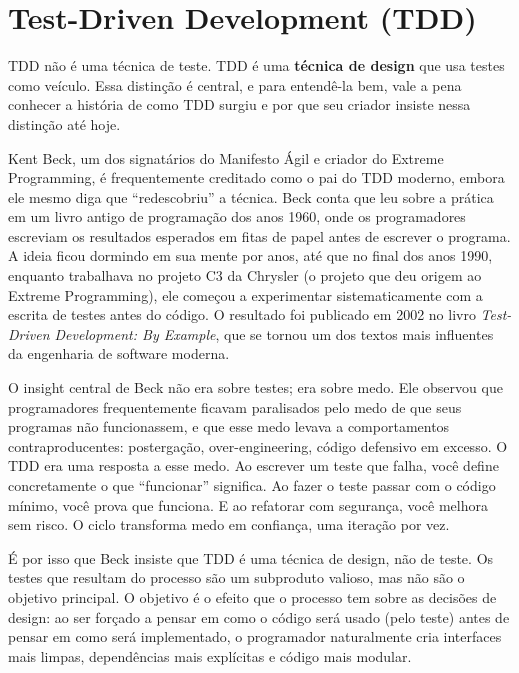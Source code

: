 \section{Test-Driven Development (TDD)}

TDD não é uma técnica de teste. TDD é uma \textbf{técnica de design} que usa
testes como veículo. Essa distinção é central, e para entendê-la
bem, vale a pena conhecer a história de como TDD surgiu e por que
seu criador insiste nessa distinção até hoje.

Kent Beck, um dos signatários do Manifesto Ágil e criador do Extreme Programming,
é frequentemente creditado como o pai do TDD moderno, embora ele mesmo diga que
``redescobriu'' a técnica. Beck conta que leu sobre a prática em um livro antigo
de programação dos anos 1960, onde os programadores escreviam os resultados
esperados em fitas de papel antes de escrever o programa. A ideia ficou dormindo
em sua mente por anos, até que no final dos anos 1990, enquanto trabalhava no
projeto C3 da Chrysler (o projeto que deu origem ao Extreme Programming), ele
começou a experimentar sistematicamente com a escrita de testes antes do código.
O resultado foi publicado em 2002 no livro \textit{Test-Driven Development: By
Example}, que se tornou um dos textos mais influentes da engenharia de software
moderna.

O insight central de Beck não era sobre testes; era sobre medo. Ele observou
que programadores frequentemente ficavam paralisados pelo medo de que seus
programas não funcionassem, e que esse medo levava a comportamentos
contraproducentes: postergação, over-engineering, código defensivo em excesso.
O TDD era uma resposta a esse medo. Ao escrever um teste que falha, você
define concretamente o que ``funcionar'' significa. Ao fazer o teste passar com
o código mínimo, você prova que funciona. E ao refatorar com segurança, você
melhora sem risco. O ciclo transforma medo em confiança, uma iteração por vez.

É por isso que Beck insiste que TDD é uma técnica de design, não de teste. Os
testes que resultam do processo são um subproduto valioso, mas não são o
objetivo principal. O objetivo é o efeito que o processo tem sobre as decisões
de design: ao ser forçado a pensar em como o código será usado (pelo teste)
antes de pensar em como será implementado, o programador naturalmente cria
interfaces mais limpas, dependências mais explícitas e código mais modular.

